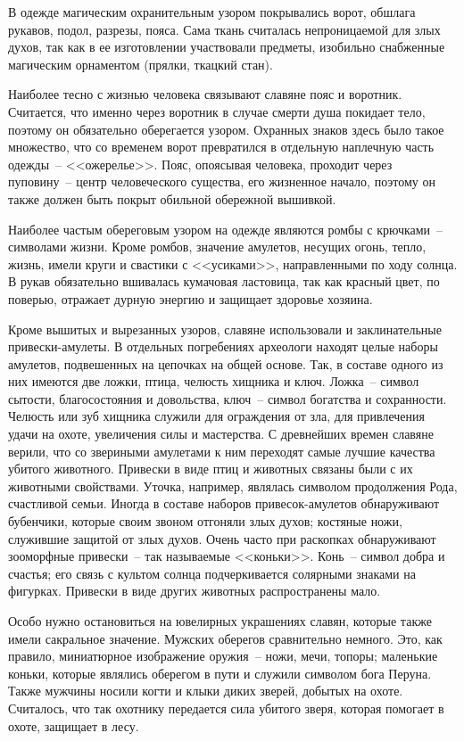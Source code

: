 \documentclass[pscyr,chapters]{hedwork}
\begin{document}
  В одежде магическим охранительным узором покрывались ворот, обшлага рукавов,
  подол, разрезы, пояса. Сама ткань считалась непроницаемой для злых духов, так
  как в ее изготовлении участвовали предметы, изобильно снабженные магическим
  орнаментом (прялки, ткацкий стан).

  Наиболее тесно с жизнью человека связывают славяне пояс и воротник. Считается,
  что именно через воротник в случае смерти душа покидает тело, поэтому он
  обязательно оберегается узором. Охранных знаков здесь было такое множество,
  что со временем ворот превратился в отдельную наплечную часть одежды~--
  <<ожерелье>>. Пояс, опоясывая человека, проходит через пуповину~-- центр
  человеческого существа, его жизненное начало, поэтому он также должен быть
  покрыт обильной обережной вышивкой.

  Наиболее частым обереговым узором на одежде являются ромбы с крючками~--
  символами жизни. Кроме ромбов, значение амулетов, несущих огонь, тепло, жизнь,
  имели  круги и свастики с <<усиками>>, направленными по ходу солнца. В рукав
  обязательно вшивалась кумачовая ластовица, так как красный цвет, по поверью,
  отражает дурную энергию и защищает здоровье хозяина.

  Кроме вышитых и вырезанных узоров, славяне использовали и заклинательные
  привески-амулеты. В отдельных погребениях археологи находят целые наборы
  амулетов, подвешенных на цепочках на общей основе. Так, в составе одного из
  них имеются две ложки, птица, челюсть хищника и ключ. Ложка~-- символ сытости,
  благосостояния и довольства, ключ~-- символ богатства и сохранности. Челюсть
  или зуб хищника служили для ограждения от зла, для привлечения удачи на охоте,
  увеличения силы и мастерства. С древнейших времен славяне верили, что со
  звериными амулетами к ним переходят самые лучшие качества убитого животного.
  Привески в виде птиц и животных связаны были с их животными свойствами.
  Уточка, например, являлась символом продолжения Рода, счастливой семьи. Иногда
  в составе наборов привесок-амулетов обнаруживают бубенчики, которые своим
  звоном отгоняли злых духов; костяные ножи, служившие защитой от злых духов.
  Очень часто при раскопках обнаруживают зооморфные привески~-- так называемые
  <<коньки>>. Конь~-- символ добра и счастья; его связь с культом солнца
  подчеркивается солярными знаками на фигурках. Привески в виде других животных
  распространены мало.

  Особо нужно остановиться на ювелирных украшениях славян, которые также имели
  сакральное значение. Мужских оберегов сравнительно немного. Это, как правило,
  миниатюрное изображение оружия~-- ножи, мечи, топоры; маленькие коньки,
  которые являлись оберегом в пути и служили символом бога Перуна. Также мужчины
  носили когти и клыки диких зверей, добытых на охоте. Считалось, что так
  охотнику передается сила убитого зверя, которая помогает в охоте, защищает в
  лесу.
\end{document}
